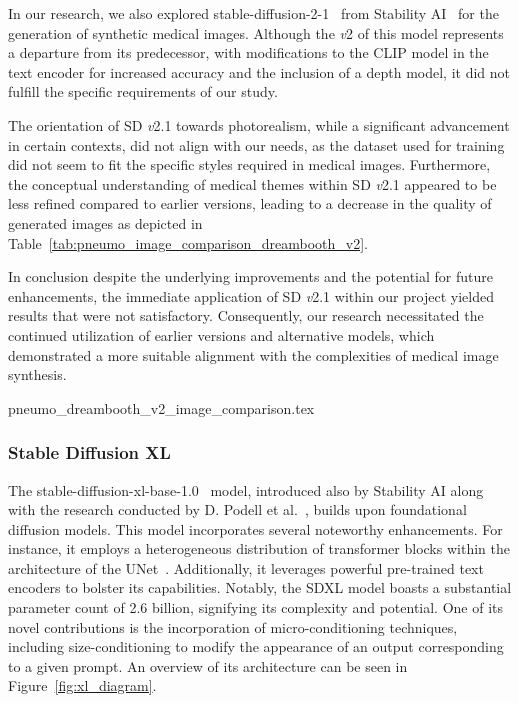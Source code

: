 In our research, we also explored stable-diffusion-2-1~\cite{StabilityAIstablediffusionv21Hugging} from Stability AI~\cite{stabilityai} for the generation of synthetic medical images. Although the \textit{v}2 of this model represents a departure from its predecessor, with modifications to the CLIP model in the text encoder for increased accuracy and the inclusion of a depth model, it did not fulfill the specific requirements of our study.

The orientation of SD \textit{v}2.1 towards photorealism, while a significant advancement in certain contexts, did not align with our needs, as the dataset used for training did not seem to fit the specific styles required in medical images. Furthermore, the conceptual understanding of medical themes within SD \textit{v}2.1 appeared to be less refined compared to earlier versions, leading to a decrease in the quality of generated images as depicted in Table~\ref{tab:pneumo_image_comparison_dreambooth_v2}. 

In conclusion despite the underlying improvements and the potential for future enhancements, the immediate application of SD \textit{v}2.1 within our project yielded results that were not satisfactory. Consequently, our research necessitated the continued utilization of earlier versions and alternative models, which demonstrated a more suitable alignment with the complexities of medical image synthesis.

{pneumo_dreambooth_v2_image_comparison.tex}

\subsubsection{Stable Diffusion XL}

The stable-diffusion-xl-base-1.0~\cite{StabilityAIstablediffusionXLHugging} model, introduced also by Stability AI along with the research conducted by D. Podell et al.~\cite{sdxl}, builds upon foundational diffusion models. This model incorporates several noteworthy enhancements. For instance, it employs a heterogeneous distribution of transformer blocks within the architecture of the UNet~\cite{unet}. Additionally, it leverages powerful pre-trained text encoders to bolster its capabilities. Notably, the SDXL model boasts a substantial parameter count of 2.6 billion, signifying its complexity and potential. One of its novel contributions is the incorporation of micro-conditioning techniques, including size-conditioning to modify the appearance of an output corresponding to a given prompt. An overview of its architecture can be seen in Figure~\ref{fig:xl_diagram}.

